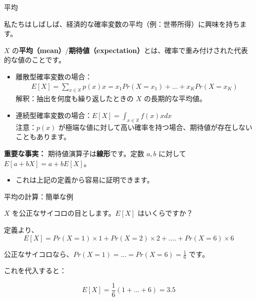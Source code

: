\documentclass[11pt,handout]{beamer}
\newenvironment{wideitemize}{\itemize\addtolength{\itemsep}{10pt}}{\enditemize}
\begin{document}
\begin{frame}{平均}

\begin{wideitemize}

\item
私たちはしばしば、経済的な確率変数の平均（例：世帯所得）に興味を持ちます。

\item\pause{}
$X$ の\textbf{平均（mean）}/\textbf{期待値（expectation）}とは、確率で重み付けされた代表的な値のことです。

\begin{itemize}
\item 離散型確率変数の場合：
\vspace{-0.1cm}
\begin{align*}
E[X]=\sum_{x\in\mathbb{X}}p(x)x=x_1Pr(X=x_1)+\dots + x_KPr(X=x_K)
\end{align*}\pause{}
\vspace{-0.2cm}
解釈：抽出を何度も繰り返したときの $X$ の長期的な平均値。\pause{}

\vspace{0.5cm}
\item 連続型確率変数の場合：$E[X]=\int_{x\in\mathbb{X}}f(x)xdx$\pause \\ 注意：$p(x)$ が極端な値に対して高い確率を持つ場合、期待値が存在しないこともあります。
\end{itemize}
\vspace{0.1cm}\pause

\item \textbf{重要な事実：} 期待値演算子は\textbf{線形}です。定数 $a, b$ に対して $E[a+bX]=a+bE[X]$。
\vspace{0.1cm}

\begin{itemize}
\item これは上記の定義から容易に証明できます。
\end{itemize}
\end{wideitemize}

\end{frame}

\begin{frame}{平均の計算：簡単な例}
	\begin{wideitemize}
		
		\item
		$X$ を公正なサイコロの目とします。$E[X]$ はいくらですか？
		
		\smallskip
		\pause
		\item
		定義より、
		$$E[X] = Pr(X=1) \times 1 + Pr(X=2) \times 2 + .... + Pr(X=6) \times 6$$
		
		\pause
		\item
\smallskip
		公正なサイコロなら、$Pr(X=1) =...=Pr(X=6) = \frac{1}{6}$ です。
		
		\pause 
		\item 
		これを代入すると：
		
		$$E[X] = \frac{1}{6} (1+...+6) = 3.5$$
		
	\end{wideitemize}	
\end{frame}
\end{document}
